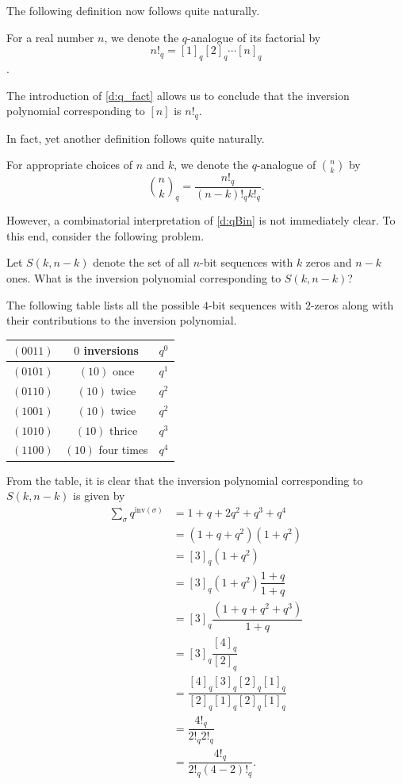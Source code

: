 The following definition now follows quite naturally.
\begin{definition}
For a real number $n$, we denote the $q$-analogue of its factorial by 
\[n!_q=[1]_q[2]_q\cdots [n]_q\].
\label{d:q_fact}
\end{definition}
\begin{remark}
The introduction of \cref{d:q_fact} allows us to conclude that the inversion polynomial corresponding to $[n]$ is $n!_q$. 
\end{remark}
In fact, yet another definition follows quite naturally.
\begin{definition}
    For appropriate choices of $n$ and $k$, we denote the $q$-analogue of $\binom{n}{k}$ by 
    \[
    \binom{n}{k}_q = \dfrac{n!_q}{(n-k)!_q k!_q}.
    \]
    \label{d:qBin}
\end{definition}
However, a combinatorial interpretation of \cref{d:qBin} is not immediately clear. To this end, consider the following problem.
\begin{question}
Let $S(k,n-k)$ denote the set of all $n$-bit sequences with $k$ zeros and $n-k$ ones. What is the inversion polynomial corresponding to $S(k,n-k)$?
\end{question}
The following table lists all the possible $4$-bit sequences with $2$-zeros along with their contributions to the inversion polynomial.
\begin{center}
	\begin{tabular}{|c|c|c|}
		\hline
		$(0011)$ & $0$ inversions & $q^0$ \\
		\hline
		$(0101)$ & $(10)$ once & $q^1$ \\
		\hline
		$(0110)$ & $(10)$ twice & $q^2$ \\
		\hline
		$(1001)$ & $(10)$ twice & $q^2$ \\
		\hline
		$(1010)$ & $(10)$ thrice & $q^3$ \\
		\hline
		$(1100)$ & $(10)$ four times & $q^4$ \\
		\hline
	\end{tabular}
\end{center}
\raggedbottom
From the table, it is clear that the inversion polynomial corresponding to $S(k,n-k)$ is given by
\begin{align*}
	\sum_{\sigma}q^{\text{inv}(\sigma)} &= 1+q+2q^2+q^3+q^4 \\
					    &= (1+q+q^2)(1+q^2) \\
					    &= [3]_q (1+q^2) \\
					    &= [3]_q (1+q^2)\dfrac{1+q}{1+q} \\
					    &= [3]_q \dfrac{(1+q+q^2+q^3)}{1+q} \\
					    &= [3]_q \dfrac{[4]_q}{[2]_q} \\
					    &= \dfrac{[4]_q[3]_q[2]_q[1]_q}{[2]_q[1]_q[2]_q[1]_q} \\
					    &= \dfrac{4!_q}{2!_q2!_q}\\
					    &= \dfrac{4!_q}{2!_q(4-2)!_q}.
\end{align*}
